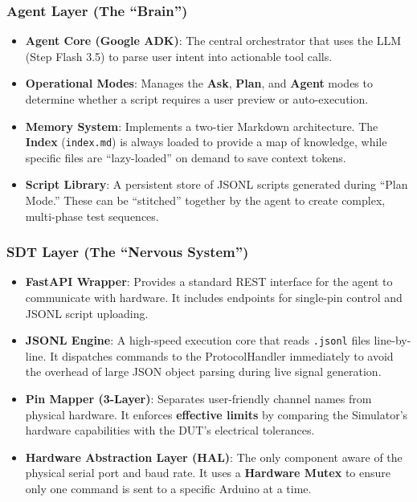 \documentclass[conference]{IEEEtran}
\begin{document}
\subsubsection{Agent Layer (The ``Brain'')}
\begin{itemize}
    \item \textbf{Agent Core (Google ADK)}: The central orchestrator that uses the LLM (Step Flash 3.5) to parse user intent into actionable tool calls.
    \item \textbf{Operational Modes}: Manages the \textbf{Ask}, \textbf{Plan}, and \textbf{Agent} modes to determine whether a script requires a user preview or auto-execution.
    \item \textbf{Memory System}: Implements a two-tier Markdown architecture. The \textbf{Index} (\texttt{index.md}) is always loaded to provide a map of knowledge, while specific files are ``lazy-loaded'' on demand to save context tokens.
    \item \textbf{Script Library}: A persistent store of JSONL scripts generated during ``Plan Mode.'' These can be ``stitched'' together by the agent to create complex, multi-phase test sequences.
\end{itemize}

\subsubsection{SDT Layer (The ``Nervous System'')}
\begin{itemize}
    \item \textbf{FastAPI Wrapper}: Provides a standard REST interface for the agent to communicate with hardware. It includes endpoints for single-pin control and JSONL script uploading.
    \item \textbf{JSONL Engine}: A high-speed execution core that reads \texttt{.jsonl} files line-by-line. It dispatches commands to the ProtocolHandler immediately to avoid the overhead of large JSON object parsing during live signal generation.
    \item \textbf{Pin Mapper (3-Layer)}: Separates user-friendly channel names from physical hardware. It enforces \textbf{effective limits} by comparing the Simulator's hardware capabilities with the DUT's electrical tolerances.
    \item \textbf{Hardware Abstraction Layer (HAL)}: The only component aware of the physical serial port and baud rate. It uses a \textbf{Hardware Mutex} to ensure only one command is sent to a specific Arduino at a time.
\end{itemize}
\end{document}
